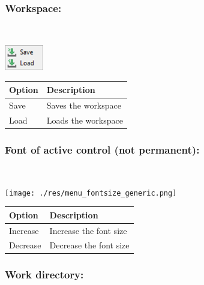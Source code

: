 \hypertarget{menu_r_term_workspace}{}
\subsubsection{Workspace:}\\

\includegraphics[scale=0.50]{./res/menu_r_term_workspace.png}\\

\begin{scriptsize}
  \begin{tabularx}{\textwidth}{>{\hsize=0.3\hsize}X>{\hsize=0.7\hsize}X}\\
    \hline
    \textbf{Option} & \textbf{Description} \\
    \hline
    Save & Saves the workspace \\
    Load & Loads the workspace \\
    \hline
  \end{tabularx}
\end{scriptsize}

\hypertarget{menu_r_term_fontsize}{}
\subsubsection{Font of active control (not permanent):}\\

\texttt{[image: ./res/menu\_fontsize\_generic.png]}\\

\begin{scriptsize}
  \begin{tabularx}{\textwidth}{>{\hsize=0.3\hsize}X>{\hsize=0.7\hsize}X}\\
    \hline
    \textbf{Option} & \textbf{Description} \\
    \hline
    Increase & Increase the font size \\
    Decrease & Decrease the font size \\
    \hline
  \end{tabularx}
\end{scriptsize}

\hypertarget{menu_r_control_workdir}{}
\subsubsection{Work directory:}\\

